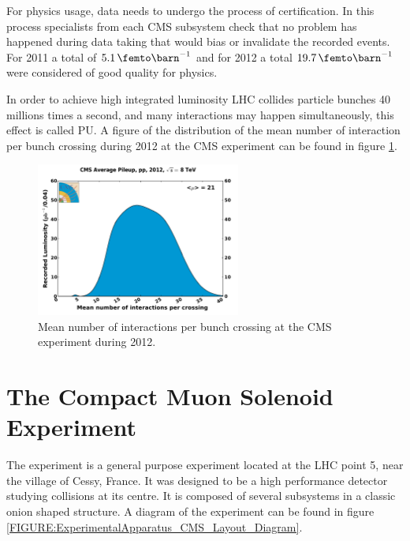 For physics usage, data needs to undergo the process of certification. In this process specialists from each \gls{CMS} subsystem check that no problem has happened during data taking that would bias or invalidate the recorded events. For 2011 a total of $5.1\,\femto\barn^{-1}$ and for 2012 a total $19.7\,\femto\barn^{-1}$ were considered of good quality for physics. 

In order to achieve high integrated luminosity \gls{LHC} collides particle bunches 40 millions times a second, and many interactions may happen simultaneously, this effect is called \gls{PU}. A figure of the distribution of the mean number of interaction per bunch crossing during 2012 at the CMS experiment can be found in figure \ref{FIGURE:ExperimentalApparatus_CMS_PileIp_pp_2012}.

\begin{figure}[!htb]
  \centering
  \includegraphics[width=0.60\textwidth]{Chapter02/CMS/Images/CMS_PileIp_pp_2012}
  \caption{Mean number of interactions per bunch crossing at the CMS experiment during 2012.}
  \label{FIGURE:ExperimentalApparatus_CMS_PileIp_pp_2012}
\end{figure}

\section{The Compact Muon Solenoid Experiment}
\label{SECTION:ExperimentalApparatus_CMS}


The  experiment is a general purpose experiment located at the \gls{LHC} point 5, near the village of Cessy, France. It was designed to be a high performance detector studying collisions at its centre. It is composed of several subsystems in a classic onion shaped structure. A diagram of the experiment can be found in figure \ref{FIGURE:ExperimentalApparatus_CMS_Layout_Diagram}.

